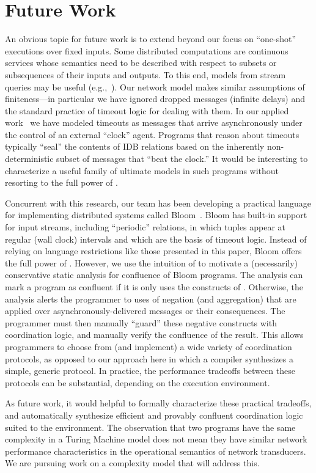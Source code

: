 \section{Future Work}
\label{sec:conclusion}

An obvious topic for future work is to extend beyond our focus on ``one-shot'' executions over fixed inputs.  
Some distributed computations are continuous services whose semantics need to be described with respect to subsets or subsequences of their inputs and outputs.  To this end, models from stream queries may be useful (e.g.,~\cite{Chandramouli2009}).  
Our network model makes similar assumptions of finiteness---in particular we have ignored dropped messages (infinite delays) and the standard practice of timeout logic for dealing with them.  In our applied work~\cite{boom,cidr11} we have modeled timeouts as messages that arrive asynchronously under the control of an external ``clock'' agent.  Programs that reason about timeouts typically ``seal'' the contents of IDB relations based on the inherently non-deterministic subset of messages that ``beat the clock.''  It would be interesting to characterize a useful family of ultimate models in such programs without resorting to the full power of \lang.

Concurrent with this research, our team has been developing a practical language for implementing distributed
systems called Bloom~\cite{bloom}.  Bloom has built-in support for input streams, including ``periodic'' relations,
in which tuples appear at regular (wall clock) intervals and which are the basis of timeout logic.
Instead of relying on language restrictions like those presented in this paper, Bloom offers the full power of \lang.  However, we use the intuition of \plang to motivate a (necessarily) conservative static analysis for confluence of Bloom programs.  The analysis can mark a program as confluent if it is only uses the constructs of \slang.  Otherwise, the analysis alerts the programmer to uses of negation (and aggregation) that are applied over asynchronously-delivered messages or their consequences.  The programmer must then manually ``guard'' these negative constructs with coordination logic, and manually verify the confluence of the result.
This allows programmers to choose from (and implement) a wide variety of coordination protocols, as opposed to our approach here in which a compiler synthesizes a simple, generic protocol.  
In practice, the performance tradeoffs between these protocols can be substantial, depending on the execution environment.  

As future work, it would helpful to formally characterize these practical tradeoffs, and automatically synthesize efficient and provably confluent coordination logic suited to the environment.
The observation that two programs have the same complexity in a Turing Machine model does not mean they have similar network performance characteristics in the operational semantics of network transducers.  We are pursuing work on a complexity model that will address this.
